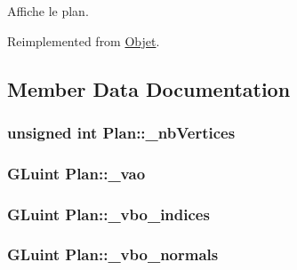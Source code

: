 Affiche le plan. 



Reimplemented from \hyperlink{class_objet_a5cc323f562964e00b947b2d908e206e7}{Objet}.



\subsection{Member Data Documentation}
\hypertarget{class_plan_af3d9228c1b7dc91c0cb00d4c8fa5a550}{
\subsubsection[{\+\_\+nb\+Vertices}]{\setlength{\rightskip}{0pt plus 5cm}unsigned int Plan\+::\+\_\+nb\+Vertices\hspace{0.3cm}{\ttfamily [private]}}}\label{class_plan_af3d9228c1b7dc91c0cb00d4c8fa5a550}
\hypertarget{class_plan_ab4efe8532b73dd0efca80000afb0027d}{
\subsubsection[{\+\_\+vao}]{\setlength{\rightskip}{0pt plus 5cm}G\+Luint Plan\+::\+\_\+vao\hspace{0.3cm}{\ttfamily [private]}}}\label{class_plan_ab4efe8532b73dd0efca80000afb0027d}
\hypertarget{class_plan_ad8791ad67d66ac1b24792dc72ec00c64}{
\subsubsection[{\+\_\+vbo\+\_\+indices}]{\setlength{\rightskip}{0pt plus 5cm}G\+Luint Plan\+::\+\_\+vbo\+\_\+indices\hspace{0.3cm}{\ttfamily [private]}}}\label{class_plan_ad8791ad67d66ac1b24792dc72ec00c64}
\hypertarget{class_plan_aa5db33661be2dfcecf68683c33eb22b9}{
\subsubsection[{\+\_\+vbo\+\_\+normals}]{\setlength{\rightskip}{0pt plus 5cm}G\+Luint Plan\+::\+\_\+vbo\+\_\+normals\hspace{0.3cm}{\ttfamily [private]}}}\label{class_plan_aa5db33661be2dfcecf68683c33eb22b9}
